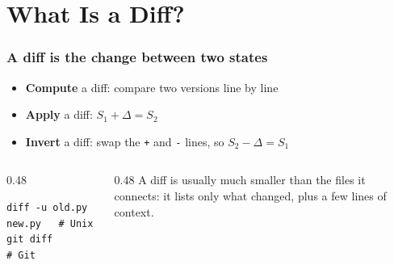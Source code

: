\documentclass[aspectratio=169,10pt,compress]{beamer}
\begin{document}
\section[Diffs]{What Is a Diff?}

\begin{frame}[t,fragile] \frametitle{A diff is the change between two states}
  \begin{center}
  \end{center}

  \begin{itemize}
    \item \textbf{Compute} a diff: compare two versions line by line
    \item \textbf{Apply} a diff: $S_1 + \Delta = S_2$
    \item \textbf{Invert} a diff: swap the \texttt{+} and \texttt{-} lines, so $S_2 - \Delta = S_1$
  \end{itemize}

  \begin{columns}[T]
    \begin{column}{0.48\textwidth}
\begin{lstlisting}
diff -u old.py new.py   # Unix
git diff                # Git
\end{lstlisting}
    \end{column}
    \begin{column}{0.48\textwidth}
      \small A diff is usually much smaller than the files it connects:
      it lists only what changed, plus a few lines of context.
    \end{column}
  \end{columns}
\end{frame}
\end{document}
